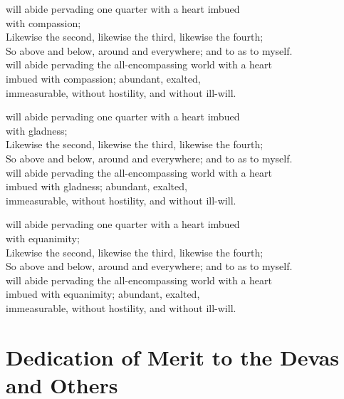  will abide pervading one quarter with a heart imbued\\
\vin with compassion;\\
Likewise the second, likewise the third, likewise the fourth;\\
So above and below, around and everywhere; and to  as to myself.\\
 will abide pervading the all-encompassing world with a heart \\
\vin imbued with compassion; abundant, exalted,\\
\vin immeasurable, without hostility, and without ill-will.

 will abide pervading one quarter with a heart imbued\\
\vin with gladness;\\
Likewise the second, likewise the third, likewise the fourth;\\
So above and below, around and everywhere; and to  as to myself.\\
 will abide pervading the all-encompassing world with a heart \\
\vin imbued with gladness; abundant, exalted,\\
\vin immeasurable, without hostility, and without ill-will.

 will abide pervading one quarter with a heart imbued\\
\vin with equanimity;\\
Likewise the second, likewise the third, likewise the fourth;\\
So above and below, around and everywhere; and to  as to myself.\\
 will abide pervading the all-encompassing world with a heart \\
\vin imbued with equanimity; abundant, exalted,\\
\vin immeasurable, without hostility, and without ill-will.

\section{Dedication of Merit to the Devas and Others}



\begin{leader}
\end{leader}

